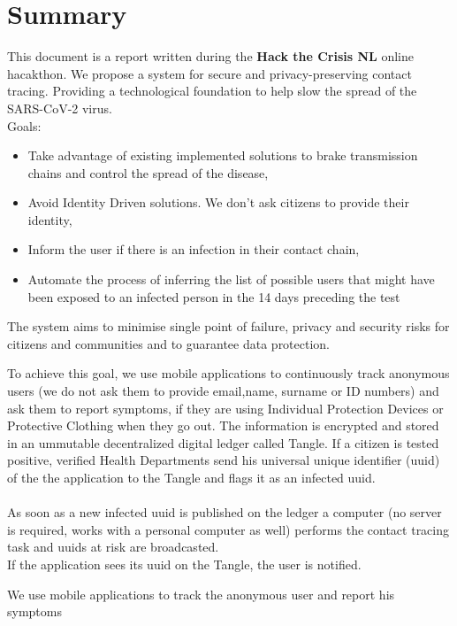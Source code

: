 {\color{PineGreen}\section{Summary}}

This document is a report written during the \textbf{Hack the Crisis NL} online hacakthon\cite{bib1}. We propose a system for secure and privacy-preserving contact tracing. Providing a technological foundation to help slow the spread of the SARS-CoV-2 virus.\\

Goals:
\begin{itemize}
\item Take advantage of existing implemented solutions to brake transmission chains and control the spread of the disease,
\item Avoid Identity Driven solutions. We don't ask citizens to provide their identity,
\item Inform the user if there is an infection in their contact chain,
\item Automate the process of inferring the list of possible users that might have been exposed to an infected person in the 14 days preceding the test
\end{itemize} 

The system aims to minimise single point of failure, privacy and security risks for citizens and communities and to guarantee data protection.

To achieve this goal, we use mobile applications to continuously track anonymous users (we do not ask them to provide email,name, surname or ID numbers) and ask them to report symptoms, if they are using Individual Protection Devices or Protective Clothing when they go out. The information is encrypted and stored in an ummutable decentralized digital ledger called Tangle. If a citizen is tested positive, verified Health Departments send his universal unique identifier (uuid) of the the application to the Tangle and flags it as an infected uuid. \\
\\
As soon as a new infected uuid is published on the ledger a computer (no server is required, works with a personal computer as well) performs the contact tracing task and uuids at risk are broadcasted.\\
If the application sees its uuid on the Tangle, the user is notified.


We use mobile applications to track the anonymous user and report his symptoms

